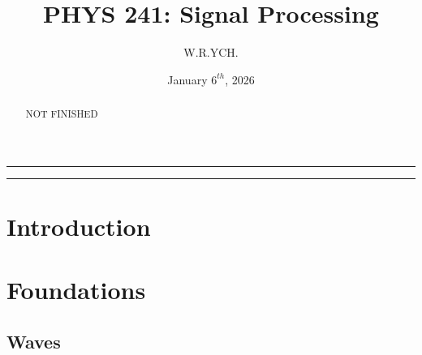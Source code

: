 \documentclass{article}
\begin{document}
\title{PHYS 241: Signal Processing}
\author{W.R.YCH.}
\date{January \(6^{th}\), 2026}
\setcounter{Maxaffil}{0}
\renewcommand\Affilfont{\itshape\small}
\maketitle

\noindent\rule{\textwidth}{0.4pt}
\thispagestyle{empty}
\begin{abstract}
    NOT FINISHED
\end{abstract}
\noindent\rule{\textwidth}{0.4pt}
\clearpage

\thispagestyle{empty}
{
  \hypersetup{linkcolor=black}
  \tableofcontents
}
\clearpage

\setcounter{page}{1}

\section{Introduction}

\section{Foundations}

\subsection{Waves}
\end{document}
